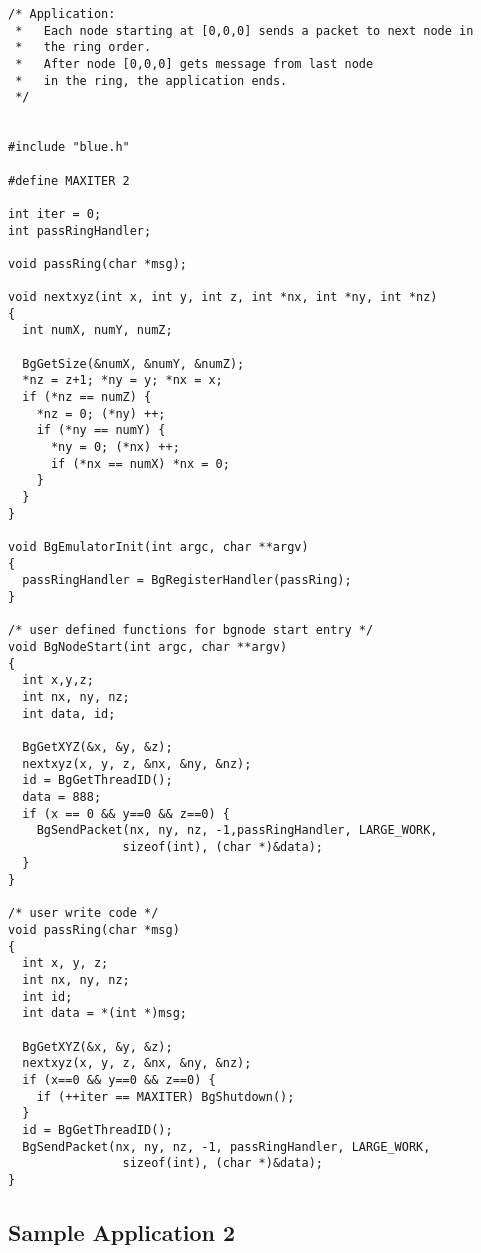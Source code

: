 \documentclass[10pt]{article}
\begin{document}
\begin{verbatim}
/* Application: 
 *   Each node starting at [0,0,0] sends a packet to next node in
 *   the ring order.
 *   After node [0,0,0] gets message from last node
 *   in the ring, the application ends.
 */


#include "blue.h"

#define MAXITER 2

int iter = 0;
int passRingHandler;

void passRing(char *msg);

void nextxyz(int x, int y, int z, int *nx, int *ny, int *nz)
{
  int numX, numY, numZ;

  BgGetSize(&numX, &numY, &numZ);
  *nz = z+1; *ny = y; *nx = x;
  if (*nz == numZ) {
    *nz = 0; (*ny) ++;
    if (*ny == numY) {
      *ny = 0; (*nx) ++;
      if (*nx == numX) *nx = 0;
    }
  }
}

void BgEmulatorInit(int argc, char **argv)
{
  passRingHandler = BgRegisterHandler(passRing);
}

/* user defined functions for bgnode start entry */
void BgNodeStart(int argc, char **argv)
{
  int x,y,z;
  int nx, ny, nz;
  int data, id;

  BgGetXYZ(&x, &y, &z);
  nextxyz(x, y, z, &nx, &ny, &nz);
  id = BgGetThreadID();
  data = 888;
  if (x == 0 && y==0 && z==0) {
    BgSendPacket(nx, ny, nz, -1,passRingHandler, LARGE_WORK, 
				sizeof(int), (char *)&data);
  }
}

/* user write code */
void passRing(char *msg)
{
  int x, y, z;
  int nx, ny, nz;
  int id;
  int data = *(int *)msg;

  BgGetXYZ(&x, &y, &z);
  nextxyz(x, y, z, &nx, &ny, &nz);
  if (x==0 && y==0 && z==0) {
    if (++iter == MAXITER) BgShutdown();
  }
  id = BgGetThreadID();
  BgSendPacket(nx, ny, nz, -1, passRingHandler, LARGE_WORK, 
				sizeof(int), (char *)&data);
}

\end{verbatim}


\subsection{Sample Application 2}
\end{document}
